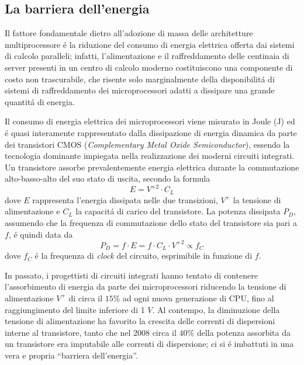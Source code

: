 \subsection{La barriera dell'energia}
\nocite{Spirito2021}
Il fattore fondamentale dietro all'adozione di massa delle architetture multiprocessore \'e la riduzione del consumo di energia elettrica offerta dai sistemi di calcolo paralleli; infatti, l'alimentazione e il raffreddamento delle centinaia di server presenti in un centro di calcolo moderno costituiscono una componente di costo non trascurabile, che risente solo marginalmente della disponibilit\'a di sistemi di raffreddamento dei microprocessori adatti a dissipare una grande quantit\'a di energia.

Il consumo di energia elettrica dei microprocessori viene misurato in Joule (\si{J}) ed \'e quasi interamente rappresentato dalla dissipazione di energia dinamica da parte dei transistori CMOS (\textit{Complementary Metal Oxide Semiconductor}), essendo la tecnologia dominante impiegata nella realizzazione dei moderni circuiti integrati.
Un transistore assorbe prevalentemente energia elettrica durante la commutazione alto-basso-alto del suo stato di uscita, secondo la formula
$$
    E = V^{+2} \cdot C_{L}
$$
dove $E$ rappresenta l'energia dissipata nelle due transizioni, $V^{+}$ la tensione di alimentazione e $C_{L}$ la capacit\'a di carico del transistore.\newline
La potenza dissipata $P_{D}$, assumendo che la frequenza di commutazione dello stato del transistore sia pari a $f$, \'e quindi data da
$$
    P_{D} = f \cdot E = f \cdot C_{L} \cdot V^{+2} \propto f_{C}
$$
dove $f_{C}$ \'e la frequenza di \textit{clock} del circuito, esprimibile in funzione di $f$.

In passato, i progettisti di circuiti integrati hanno tentato di contenere l'assorbimento di energia da parte dei microprocessori riducendo la tensione di alimentazione $V^{+}$ di circa il $15\%$ ad ogni nuova generazione di CPU, fino al raggiungimento del limite inferiore di 1 $\si{V}$.\newline
Al contempo, la diminuzione della tensione di alimentazione ha favorito la crescita delle correnti di dispersioni interne al transistore, tanto che nel 2008 circa il $40\%$ della potenza assorbita da un transistore era imputabile alle correnti di dispersione; ci si \'e imbattuti in una vera e propria \enquote{barriera dell'energia}.

